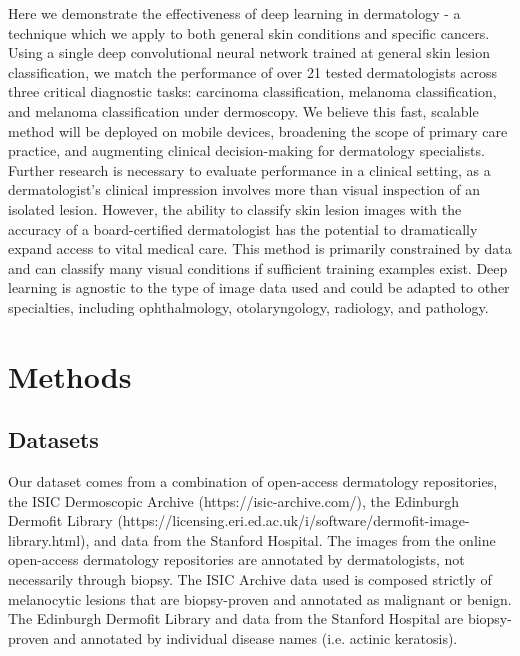 Here we demonstrate the effectiveness of deep learning in dermatology -  a technique which we apply to both general skin conditions and specific cancers. Using a single deep convolutional neural network trained at general skin lesion classification, we match the performance of over 21 tested dermatologists across three critical diagnostic tasks: carcinoma classification, melanoma classification, and melanoma classification under dermoscopy. We believe this fast, scalable method will be deployed on mobile devices, broadening the scope of primary care practice, and augmenting clinical decision-making for dermatology specialists. Further research is necessary to evaluate performance in a clinical setting, as a dermatologist’s clinical impression involves more than visual inspection of an isolated lesion. However, the ability to classify skin lesion images with the accuracy of a board-certified dermatologist has the potential to dramatically expand access to vital medical care. This method is primarily constrained by data and can classify many visual conditions if sufficient training examples exist. Deep learning is agnostic to the type of image data used and could be adapted to other specialties, including ophthalmology, otolaryngology, radiology, and pathology. 

\section{Methods}

\subsection{Datasets}
Our dataset comes from a combination of open-access dermatology repositories, the ISIC Dermoscopic Archive (https://isic-archive.com/), the Edinburgh Dermofit Library (https://licensing.eri.ed.ac.uk/i/software/dermofit-image-library.html), and data from the Stanford Hospital. The images from the online open-access dermatology repositories are annotated by dermatologists, not necessarily through biopsy. The ISIC Archive data used is composed strictly of melanocytic lesions that are biopsy-proven and annotated as malignant or benign. The Edinburgh Dermofit Library and data from the Stanford Hospital are biopsy-proven and annotated by individual disease names (i.e. actinic keratosis). 

